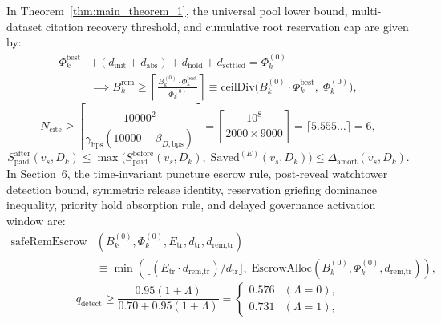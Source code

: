 \documentclass[runningheads,a4paper]{llncs}
\renewcommand{\_}{\textunderscore\allowbreak}
\begin{document}
In Theorem~\ref{thm:main_theorem_1}, the universal pool lower bound, multi-dataset citation recovery threshold, and cumulative root reservation cap are given by:
\begin{equation}
\label{eq:pool_lower_ceil}
\begin{aligned}
\Phi_k^{\text{best}} &+ (d_{\text{init}} + d_{\text{abs}}) + d_{\text{hold}} + d_{\text{settled}} = \Phi_k^{(0)} \\
&\implies B_k^{\text{rem}} \ge \left\lceil \frac{B_k^{(0)} \cdot \Phi_k^{\text{best}}}{\Phi_k^{(0)}} \right\rceil \equiv \text{ceilDiv}\big(B_k^{(0)} \cdot \Phi_k^{\text{best}}, \; \Phi_k^{(0)}\big),
\end{aligned}
\end{equation}
\begin{equation}
\label{eq:n_cite_threshold}
N_{\text{cite}} \ge \left\lceil \frac{10000^2}{\gamma_{\text{bps}} (10000 - \beta_{D,\text{bps}})} \right\rceil = \left\lceil \frac{10^8}{2000 \times 9000} \right\rceil = \lceil 5.555\dots \rceil = 6,
\end{equation}
\begin{equation}
\label{eq:cap_fold_bound}
S_{\text{paid}}^{\text{after}}(v_s, D_k) \le \max\big(S_{\text{paid}}^{\text{before}}(v_s, D_k), \; \text{Saved}^{(E)}(v_s, D_k)\big) \le \Delta_{\text{amort}}(v_s, D_k).
\end{equation}
In Section~6, the time-invariant puncture escrow rule, post-reveal watchtower detection bound, symmetric release identity, reservation griefing dominance inequality, priority hold absorption rule, and delayed governance activation window are:
\begin{equation}
\label{eq:safe_rem_escrow}
\begin{aligned}
\text{safeRemEscrow}&(B_k^{(0)}, \Phi_k^{(0)}, E_{\text{tr}}, d_{\text{tr}}, d_{\text{rem,tr}}) \\
&\equiv \min\!\left(\lfloor (E_{\text{tr}} \cdot d_{\text{rem,tr}}) / d_{\text{tr}} \rfloor, \; \text{EscrowAlloc}(B_k^{(0)}, \Phi_k^{(0)}, d_{\text{rem,tr}})\right),
\end{aligned}
\end{equation}
\begin{equation}
\label{eq:q_detect_bounds}
q_{\text{detect}} \ge \frac{0.95(1 + \Lambda)}{0.70 + 0.95(1 + \Lambda)} = \begin{cases} 0.576 & (\Lambda = 0), \\ 0.731 & (\Lambda = 1), \end{cases}
\end{equation}
\end{document}

